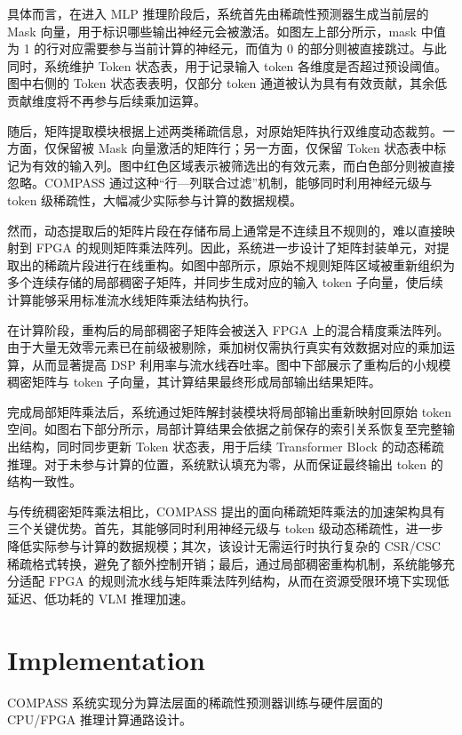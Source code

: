 \documentclass[sigconf]{acmart}
\begin{document}
	具体而言，在进入 MLP 推理阶段后，系统首先由稀疏性预测器生成当前层的 Mask 向量，用于标识哪些输出神经元会被激活。如图左上部分所示，mask 中值为 1 的行对应需要参与当前计算的神经元，而值为 0 的部分则被直接跳过。与此同时，系统维护 Token 状态表，用于记录输入 token 各维度是否超过预设阈值。图中右侧的 Token 状态表表明，仅部分 token 通道被认为具有有效贡献，其余低贡献维度将不再参与后续乘加运算。
	
	随后，矩阵提取模块根据上述两类稀疏信息，对原始矩阵执行双维度动态裁剪。一方面，仅保留被 Mask 向量激活的矩阵行；另一方面，仅保留 Token 状态表中标记为有效的输入列。图中红色区域表示被筛选出的有效元素，而白色部分则被直接忽略。COMPASS 通过这种“行—列联合过滤”机制，能够同时利用神经元级与 token 级稀疏性，大幅减少实际参与计算的数据规模。
	
	然而，动态提取后的矩阵片段在存储布局上通常是不连续且不规则的，难以直接映射到 FPGA 的规则矩阵乘法阵列。因此，系统进一步设计了矩阵封装单元，对提取出的稀疏片段进行在线重构。如图中部所示，原始不规则矩阵区域被重新组织为多个连续存储的局部稠密子矩阵，并同步生成对应的输入 token 子向量，使后续计算能够采用标准流水线矩阵乘法结构执行。
	
	在计算阶段，重构后的局部稠密子矩阵会被送入 FPGA 上的混合精度乘法阵列。由于大量无效零元素已在前级被剔除，乘加树仅需执行真实有效数据对应的乘加运算，从而显著提高 DSP 利用率与流水线吞吐率。图中下部展示了重构后的小规模稠密矩阵与 token 子向量，其计算结果最终形成局部输出结果矩阵。
	
	完成局部矩阵乘法后，系统通过矩阵解封装模块将局部输出重新映射回原始 token 空间。如图右下部分所示，局部计算结果会依据之前保存的索引关系恢复至完整输出结构，同时同步更新 Token 状态表，用于后续 Transformer Block 的动态稀疏推理。对于未参与计算的位置，系统默认填充为零，从而保证最终输出 token 的结构一致性。
	
	与传统稠密矩阵乘法相比，COMPASS 提出的面向稀疏矩阵乘法的加速架构具有三个关键优势。首先，其能够同时利用神经元级与 token 级动态稀疏性，进一步降低实际参与计算的数据规模；其次，该设计无需运行时执行复杂的 CSR/CSC 稀疏格式转换，避免了额外控制开销；最后，通过局部稠密重构机制，系统能够充分适配 FPGA 的规则流水线与矩阵乘法阵列结构，从而在资源受限环境下实现低延迟、低功耗的 VLM 推理加速。
	
	\section{Implementation}
	
	COMPASS 系统实现分为算法层面的稀疏性预测器训练与硬件层面的 CPU/FPGA 推理计算通路设计。
	
\end{document}
